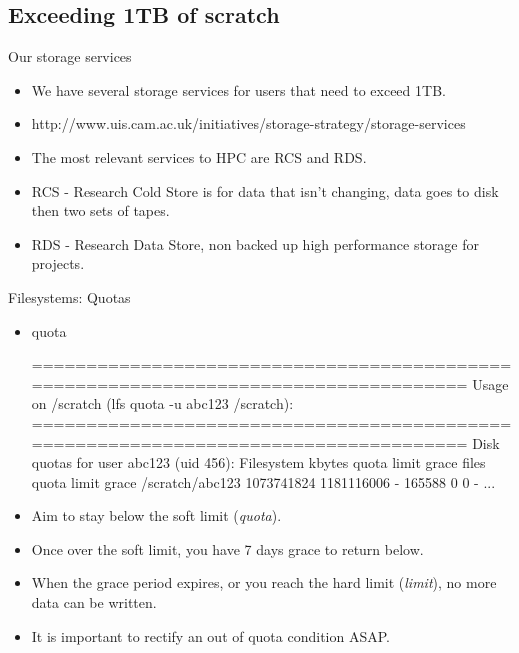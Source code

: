 \subsection{Exceeding 1TB of scratch}
\begin{frame}{Our storage services}
\begin{itemize}
\item{We have several storage services for users that need to exceed 1TB.}
\pause
\item{\alert{http://www.uis.cam.ac.uk/initiatives/storage-strategy/storage-services}}
\item{The most relevant services to HPC are RCS and RDS.}
\item{RCS - Research Cold Store is for data that isn't changing, data goes to disk then two sets of tapes.}
\item{RDS - Research Data Store, non backed up high performance storage for projects.}
\end{itemize}
\end{frame}

\begin{frame}[fragile]{Filesystems: Quotas}
\begin{itemize}
\item{quota}
\begin{semiverbatim}
\tiny
====================================================================================
Usage on /scratch (lfs quota -u abc123 /scratch):
====================================================================================
Disk quotas for user abc123 (uid 456):
      Filesystem  kbytes   quota   limit   grace   files   quota   limit   grace
 /scratch/abc123   1073741824 1181116006   -   165588       0       0       -
...
\end{semiverbatim}
\item<1-|handout:1->{\alert{Aim to stay below the soft limit (\emph{quota}).}}
\item<2-|handout:1->{\alert{Once over the soft limit, you have 7 days grace to return below.}}
\item<3-|handout:2>{\alert{When the grace period expires, or you reach the hard limit (\emph{limit}), no more data can be written.}}
\item<4-|handout:2>{\alert{It is important to rectify an out of quota condition ASAP.}}
\end{itemize}
\end{frame}

